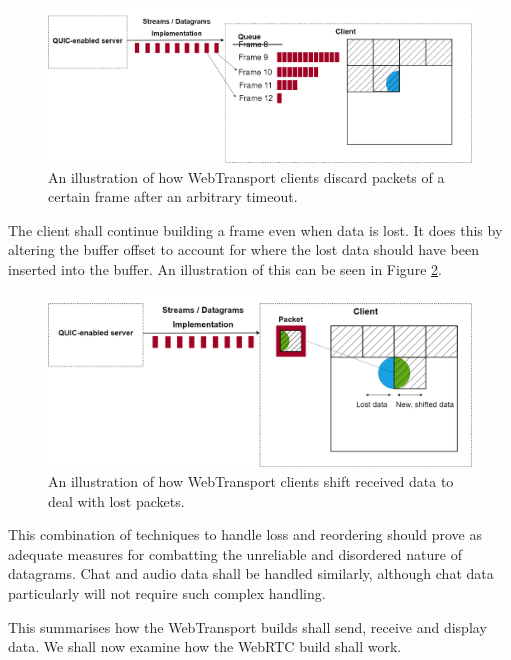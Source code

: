 \begin{figure}[h]
    \centering
    \includegraphics[width=1\linewidth]{images/late packets.png}
	\caption{An illustration of how WebTransport clients discard packets of a certain frame after an arbitrary timeout.}
    \label{wt_design_latepackets}
\end{figure}

The client shall continue building a frame even when data is lost. It does this by altering the buffer offset to account for where the lost data should have been inserted into the buffer. An illustration of this can be seen in Figure \ref{wt_design_shifteddata}.

\begin{figure}[h]
    \centering
    \includegraphics[width=1\linewidth]{images/shifted data.png}
	\caption{An illustration of how WebTransport clients shift received data to deal with lost packets.}
    \label{wt_design_shifteddata}
\end{figure}

This combination of techniques to handle loss and reordering should prove as adequate measures for combatting the unreliable and disordered nature of datagrams. Chat and audio data shall be handled similarly, although chat data particularly will not require such complex handling.

This summarises how the WebTransport builds shall send, receive and display data. We shall now examine how the WebRTC build shall work.


